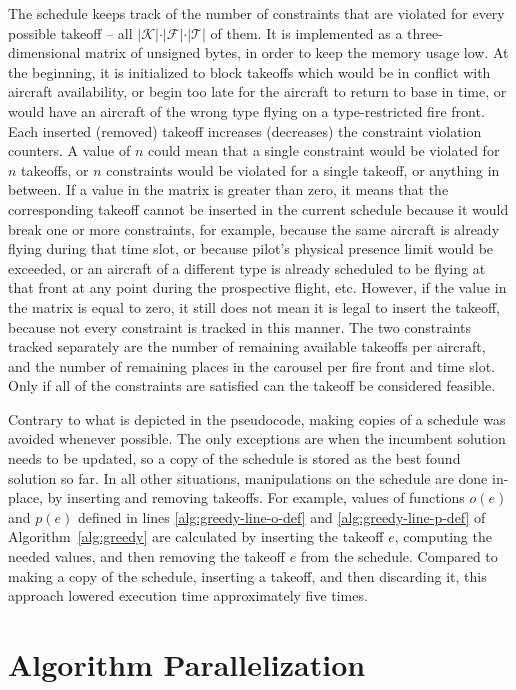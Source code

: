 The schedule keeps track of the number of constraints that are violated for every possible takeoff -- all $\vert \mathcal{K} \vert \cdot \vert \mathcal{F} \vert \cdot \vert \mathcal{T} \vert$ of them.
It is implemented as a three-dimensional matrix of unsigned bytes, in order to keep the memory usage low.
At the beginning, it is initialized to block takeoffs which would be in conflict with aircraft availability, or begin too late for the aircraft to return to base in time, or would have an aircraft of the wrong type flying on a type-restricted fire front.
Each inserted (removed) takeoff increases (decreases) the constraint violation counters.
A value of $n$ could mean that a single constraint would be violated for $n$ takeoffs, or $n$ constraints would be violated for a single takeoff, or anything in between.
If a value in the matrix is greater than zero, it means that the corresponding takeoff cannot be inserted in the current schedule because it would break one or more constraints, for example, because the same aircraft is already flying during that time slot, or because pilot's physical presence limit would be exceeded, or an aircraft of a different type is already scheduled to be flying at that front at any point during the prospective flight, etc.
However, if the value in the matrix is equal to zero, it still does not mean it is legal to insert the takeoff, because not every constraint is tracked in this manner.
The two constraints tracked separately are the number of remaining available takeoffs per aircraft, and the number of remaining places in the carousel per fire front and time slot.
Only if all of the constraints are satisfied can the takeoff be considered feasible.

Contrary to what is depicted in the pseudocode, making copies of a schedule was avoided whenever possible.
The only exceptions are when the incumbent solution needs to be updated, so a copy of the schedule is stored as the best found solution so far.
In all other situations, manipulations on the schedule are done in-place, by inserting and removing takeoffs.
For example, values of functions $o(e)$ and $p(e)$ defined in lines \ref{alg:greedy-line-o-def} and \ref{alg:greedy-line-p-def} of Algorithm~\ref{alg:greedy} are calculated by inserting the takeoff $e$, computing the needed values, and then removing the takeoff $e$ from the schedule.
Compared to making a copy of the schedule, inserting a takeoff, and then discarding it, this approach lowered execution time approximately five times.


\section{Algorithm Parallelization}


